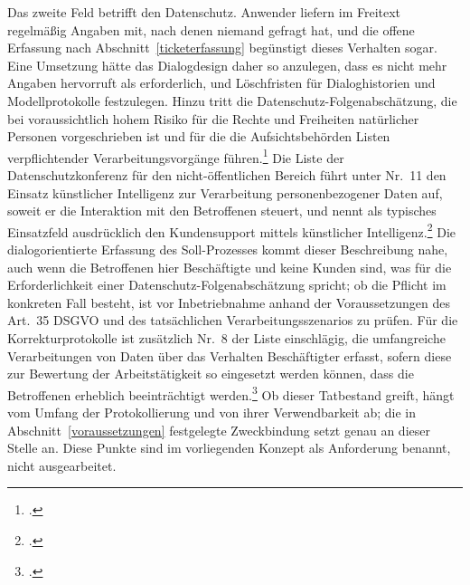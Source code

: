 Das zweite Feld betrifft den Datenschutz. Anwender liefern im Freitext regelm\"a{\ss}ig Angaben mit, nach denen niemand gefragt hat, und die offene Erfassung nach Abschnitt~\ref{ticketerfassung} beg\"unstigt dieses Verhalten sogar. Eine Umsetzung h\"atte das Dialogdesign daher so anzulegen, dass es nicht mehr Angaben hervorruft als erforderlich, und L\"oschfristen f\"ur Dialoghistorien und Modellprotokolle festzulegen. Hinzu tritt die Datenschutz-Folgenabsch\"atzung, die bei voraussichtlich hohem Risiko f\"ur die Rechte und Freiheiten nat\"urlicher Personen vorgeschrieben ist und f\"ur die die Aufsichtsbeh\"orden Listen verpflichtender Verarbeitungsvorg\"ange f\"uhren.\footcite[Vgl.][Art.~35 Abs.~1 und 4]{DSGVO} Die Liste der Datenschutzkonferenz f\"ur den nicht-\"offentlichen Bereich f\"uhrt unter Nr.~11 den Einsatz k\"unstlicher Intelligenz zur Verarbeitung personenbezogener Daten auf, soweit er die Interaktion mit den Betroffenen steuert, und nennt als typisches Einsatzfeld ausdr\"ucklich den Kundensupport mittels k\"unstlicher Intelligenz.\footcite[Vgl.][Nr.~11, S.~3]{DSK2018} Die dialogorientierte Erfassung des Soll-Prozesses kommt dieser Beschreibung nahe, auch wenn die Betroffenen hier Besch\"aftigte und keine Kunden sind, was f\"ur die Erforderlichkeit einer Datenschutz-Folgenabsch\"atzung spricht; ob die Pflicht im konkreten Fall besteht, ist vor Inbetriebnahme anhand der Voraussetzungen des Art.~35 DSGVO und des tats\"achlichen Verarbeitungsszenarios zu pr\"ufen. F\"ur die Korrekturprotokolle ist zus\"atzlich Nr.~8 der Liste einschl\"agig, die umfangreiche Verarbeitungen von Daten \"uber das Verhalten Besch\"aftigter erfasst, sofern diese zur Bewertung der Arbeitst\"atigkeit so eingesetzt werden k\"onnen, dass die Betroffenen erheblich beeintr\"achtigt werden.\footcite[Vgl.][Nr.~8, S.~3]{DSK2018} Ob dieser Tatbestand greift, h\"angt vom Umfang der Protokollierung und von ihrer Verwendbarkeit ab; die in Abschnitt~\ref{voraussetzungen} festgelegte Zweckbindung setzt genau an dieser Stelle an. Diese Punkte sind im vorliegenden Konzept als Anforderung benannt, nicht ausgearbeitet.


